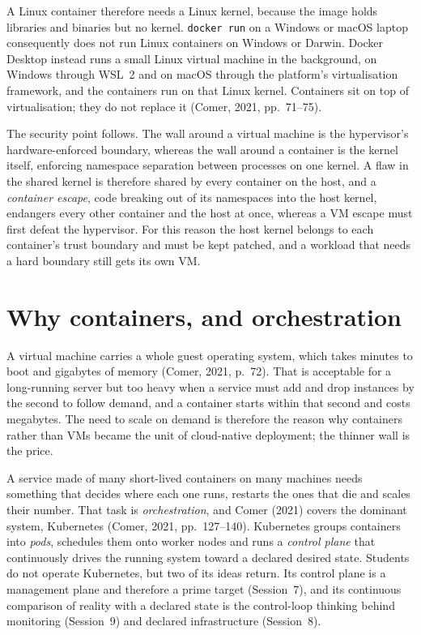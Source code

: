 A Linux container therefore needs a Linux kernel, because the image holds
libraries and binaries but no kernel. \texttt{docker run} on a Windows or
macOS laptop consequently does not run Linux containers on Windows or
Darwin. Docker Desktop instead runs a small Linux virtual machine in the
background, on Windows through WSL~2 and on macOS through the platform's
virtualisation framework, and the containers run on that Linux kernel.
Containers sit on top of virtualisation; they do not replace it (Comer,
2021, pp.~71--75).

The security point follows. The wall around a virtual machine is the
hypervisor's hardware-enforced boundary, whereas the wall around a
container is the kernel itself, enforcing namespace separation between
processes on one kernel. A flaw in the shared kernel is therefore shared by
every container on the host, and a \emph{container escape}, code breaking
out of its namespaces into the host kernel, endangers every other container
and the host at once, whereas a VM escape must first defeat the hypervisor.
For this reason the host kernel belongs to each container's trust boundary
and must be kept patched, and a workload that needs a hard boundary still
gets its own VM.

\section{Why containers, and orchestration}

A virtual machine carries a whole guest operating system, which takes
minutes to boot and gigabytes of memory (Comer, 2021, p.~72). That is
acceptable for a long-running server but too heavy when a service must add
and drop instances by the second to follow demand, and a container starts
within that second and costs megabytes. The need to scale on demand is
therefore the reason why containers rather than VMs became the unit of
cloud-native deployment; the thinner wall is the price.

A service made of many short-lived containers on many machines needs
something that decides where each one runs, restarts the ones that die and
scales their number. That task is \emph{orchestration}, and Comer (2021)
covers the dominant system, Kubernetes (Comer, 2021, pp.~127--140).
Kubernetes groups containers into \emph{pods}, schedules them onto worker
nodes and runs a \emph{control plane} that continuously drives the running
system toward a declared desired state. Students do not operate Kubernetes,
but two of its ideas return. Its control plane is a management plane and
therefore a prime target (Session~7), and its continuous comparison of
reality with a declared state is the control-loop thinking behind
monitoring (Session~9) and declared infrastructure (Session~8).

